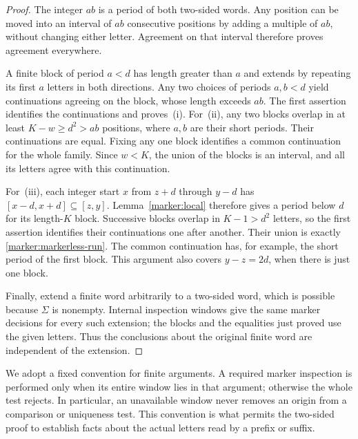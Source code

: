 \begin{proof}
The integer $ab$ is a period of both two-sided words. Any position
can be moved into an interval of $ab$ consecutive positions by adding
a multiple of $ab$, without changing either letter. Agreement on
that interval therefore proves agreement everywhere.

A finite block of period $a<d$ has length greater than $a$ and
extends by repeating its first $a$ letters in both directions. Any
two choices of periods $a,b<d$ yield continuations agreeing on the
block, whose length exceeds $ab$. The first assertion identifies the
continuations and proves~\textup{(i)}. For~\textup{(ii)}, any two
blocks overlap in at least $K-w\ge d^2>ab$ positions, where $a,b$
are their short periods. Their continuations are equal. Fixing any
one block identifies a common continuation for the whole family.
Since $w<K$, the union of the blocks is an interval, and all its
letters agree with this continuation.

For~\textup{(iii)}, each integer start $x$ from $z+d$ through $y-d$
has $[x-d,x+d]\subseteq[z,y]$. Lemma~\ref{marker:local} therefore
gives a period below $d$ for its length-$K$ block. Successive blocks
overlap in $K-1>d^2$ letters, so the first assertion identifies their
continuations one after another. Their union is exactly
\eqref{marker:markerless-run}. The common continuation has, for
example, the short period of the first block. This argument also
covers $y-z=2d$, when there is just one block.

Finally, extend a finite word arbitrarily to a two-sided word, which
is possible because $\Sigma$ is nonempty. Internal inspection
windows give the same marker decisions for every such extension;
the blocks and the equalities just proved use the given letters.
Thus the conclusions about the original finite word are independent
of the extension.
\end{proof}

We adopt a fixed convention for finite arguments. A required marker
inspection is performed only when its entire window lies in that
argument; otherwise the whole test rejects. In particular, an unavailable
window never removes an origin from a comparison or uniqueness test.
This convention is what permits the two-sided proof to establish facts
about the actual letters read by a prefix or suffix.
